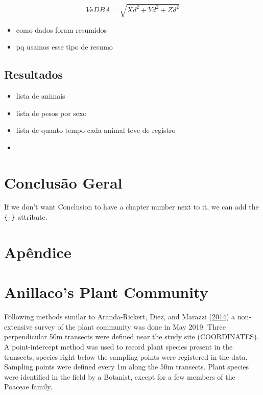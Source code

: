 \documentclass[msc,numbers,hidelinks]{coppe}
\providecommand{\tightlist}{%
  \setlength{\itemsep}{0pt}\setlength{\parskip}{0pt}}
\begin{document}
  \[ VeDBA = \sqrt{Xd^2 + Yd^2 + Zd^2} \]
  \begin{itemize}
  \tightlist
  \item
    como dados foram resumidos
  \item
    pq usamos esse tipo de resumo
  \end{itemize}
  \hypertarget{resultados}{%
  \section{Resultados}\label{resultados}}
  \begin{itemize}
  \tightlist
  \item
    lista de animais
  \item
    lista de pesos por sexo
  \item
    lista de quanto tempo cada animal teve de registro
  \item
  \end{itemize}
  \hypertarget{conclusuxe3o-geral}{%
  \chapter*{Conclusão Geral}\label{conclusuxe3o-geral}}

  If we don't want Conclusion to have a chapter number next to it, we can add the \texttt{\{-\}} attribute.

  \appendix

  \hypertarget{apuxeandice}{%
  \chapter*{Apêndice}\label{apuxeandice}}

  \hypertarget{anillacos-plant-community}{%
  \chapter{Anillaco's Plant Community}\label{anillacos-plant-community}}

  Following methods similar to Aranda-Rickert, Diez, and Marazzi (\protect\hyperlink{ref-aranda-rickertExtrafloralNectarFuels2014}{2014}) a non-extensive survey of the plant community was done in May 2019. Three perpendicular 50m transects were defined near the study site (COORDINATES). A point-intercept method was used to record plant species present in the transects, species right below the sampling points were registered in the data. Sampling points were defined every 1m along the 50m transects. Plant species were identified in the field by a Botanist, except for a few members of the Poaceae family.
\end{document}
